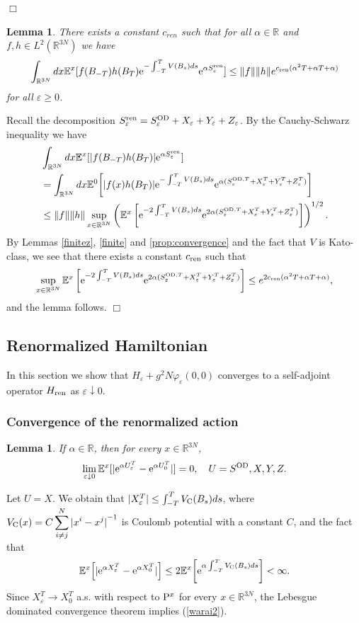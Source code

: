 \documentclass[12pt]{article}
\newtheorem{lemma}[theorem]{Lemma}
\newcommand{\bl}[1]{\begin{lemma}\label{#1}}
\newcommand{\el}{\end{lemma}}
\newcommand{\Ebb}{{\mathbb E}}
\providecommand{\eq}[1]{\begin{equation}\label{#1}}
\providecommand{\en}{\end{equation}}
\renewcommand{\d}{\displaystyle}
\providecommand{\qed}{\hfill {$\Box$}\par\medskip}
\providecommand{\BRN}{{\mathbb{R}^{3N} }}
\renewcommand{\ij}{\sum_{i\not=j}^N}
\providecommand{\od}{{\rm OD}}
\providecommand{\RR}{\mathbb{R}}
\providecommand{\kak}[1]{(\ref{#1})}
\providecommand{\lk}{\left(}
\providecommand{\rk}{\right)}
\providecommand{\han}{{1/2}}
\providecommand{\non}{\nonumber}
\providecommand{\IP}{{\rm P}}
\providecommand{\e}{{\rm e}}
\providecommand{\1}{\mathbb{1}}
\providecommand{\eps}{\varepsilon}
\providecommand{\ren}{{\rm ren}}
\newcounter {constant}
\begin{document}
\qed

\begin{lemma}
\label{prop:exp-int}
There exists a constant $c_{ren}$ such that for all $\alpha\in\RR$ and  $f,h\in L^2(\BRN)$ we have
$$
\d \int_{\BRN} dx \Ebb^x[f(B_{-T}) h(B_{T}) \e^{-\int_{-T}^TV(B_s) ds}
\e^{\alpha S_\eps^\ren }]\le  \|f\| \|h \| e^{c_\ren(\alpha^2 T+\alpha T + \alpha )}
$$
for all $\eps\geq0$.
\end{lemma}
\proof
Recall the decomposition $S_\eps^\ren  = S_\eps^{\od}+X_\eps+Y_\eps + Z_\eps$. By the Cauchy-Schwarz
inequality we have
\begin{align}
&
\int_{\BRN} dx \Ebb^x[|f(B_{-T}) h(B_T)| \e^{\alpha S_\eps^\ren }]\non\\
&=
\int_{\BRN} dx \Ebb^0\!\left[|f(x) h(B_{T})|\e^{-\int_{-T}^{T}V(B_s) ds}
\e^{\alpha(
S_\eps^{\od, T}+X_\eps^T+Y_\eps^T+Z_\eps^T)
} \right]\non\\
&\label{tosan}
\leq \|f\| \|h \| \sup_{x\in\BRN}
\lk
\Ebb^x
\left[\e^{-2\int_{-T}^{T}V(B_s) ds} \e^{2\alpha(
S_\eps^{\od, T}+X_\eps^T+Y_\eps^T+Z_\eps^T)}
\right]\rk^\han.
\end{align}
By Lemmas \ref{finitez}, \ref{finite} and \ref{prop:convergence} and the fact that $V$ is Kato-class, we see that there exists a constant $c_{\ren}$ such that
$$
\sup_{x\in\BRN} \Ebb^x\left[\e^{-2\int_{-T}^{T}V(B_s) ds} \e^{
2\alpha(
S_\eps^{\od, T}+
X_\eps^T+Y_\eps^T+Z_\eps^T)}\right]\le e^{2 c_\ren(\alpha^2 T+\alpha T+\alpha )},
$$
and the lemma follows.
\qed


\subsection{Renormalized Hamiltonian}
In this section we show that $H_\eps+g^2 N \varphi_\eps(0,0)$ converges to  a self-adjoint operator
$H_{\ren}$ as $\eps\downarrow 0$.

\subsubsection{Convergence of the renormalized action}
\label{222}

\bl{convexp2}
If $\alpha\in\RR$, then for every $x\in\BRN$,
\eq{warai2}
\lim_{\eps\downarrow 0}\Ebb^x[|\e^{\alpha U_\eps^T}-\e^{\alpha U_0^T}|]=0,\quad
U=S^{\od}, X, Y, Z.
\en
\el
\proof
Let $U=X$. We obtain that $|X_\eps^T|\leq \int_{-T}^{T} V_{\rm C}(B_s)ds$, where $\d V_{\rm C}(x)=
C\ij {|x^i-x^j|}^{-1}$ is Coulomb potential with a constant $C$, and the fact that
$$
\Ebb^x\!\left[|\e^{\alpha X_\eps^T}-\e^{\alpha X_0^T}|\right]
\leq
2 \Ebb^x\!\left[\e^{\alpha \int_{-T}^T V_{\rm C}(B_s)ds}\right]<\infty.
$$
Since $X_\eps^T\to X_0^T$ a.s. with respect to $\IP^x$ for every $x\in\BRN$,  the Lebesgue dominated 
convergence theorem implies
\kak{warai2}.
\end{document}

